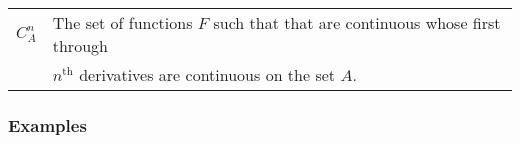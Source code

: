 \documentclass[12pt]{article}
\begin{document}
\begin{tabular}{|l | l |}
$ C_A^n$  &  The set of functions $F$ such that that are continuous whose first   through  \\
                   & $n^{\mbox{th}}$  derivatives are continuous on the set $A$. \\  \hline        
                   

                   
\end{tabular}

\subsubsection*{Examples}
\end{document}
